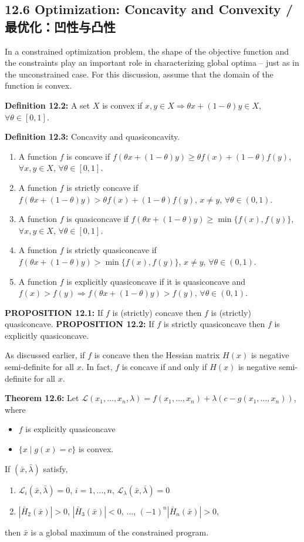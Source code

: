 \subsection{12.6 Optimization: Concavity and Convexity / 最优化：凹性与凸性}

\begin{original}
In a constrained optimization problem, the shape of the objective function and the constraints play an important role in characterizing global optima -- just as in the unconstrained case. For this discussion, assume that the domain of the function is convex.

\textbf{Definition 12.2:} A set $X$ is convex if $x, y \in X \Rightarrow \theta x + (1-\theta)y \in X$, $\forall \theta \in [0,1]$.

\textbf{Definition 12.3:} Concavity and quasiconcavity.
\begin{enumerate}
\item A function $f$ is concave if $f(\theta x + (1-\theta)y) \geq \theta f(x) + (1-\theta)f(y)$, $\forall x,y \in X$, $\forall \theta \in [0,1]$.
\item A function $f$ is strictly concave if $f(\theta x + (1-\theta)y) > \theta f(x) + (1-\theta)f(y)$, $x \neq y$, $\forall \theta \in (0,1)$.
\item A function $f$ is quasiconcave if $f(\theta x + (1-\theta)y) \geq \min\{f(x), f(y)\}$, $\forall x,y \in X$, $\forall \theta \in [0,1]$.
\item A function $f$ is strictly quasiconcave if $f(\theta x + (1-\theta)y) > \min\{f(x), f(y)\}$, $x \neq y$, $\forall \theta \in (0,1)$.
\item A function $f$ is explicitly quasiconcave if it is quasiconcave and $f(x) > f(y) \Rightarrow f(\theta x + (1-\theta)y) > f(y)$, $\forall \theta \in (0,1)$.
\end{enumerate}

\textbf{PROPOSITION 12.1:} If $f$ is (strictly) concave then $f$ is (strictly) quasiconcave.
\textbf{PROPOSITION 12.2:} If $f$ is strictly quasiconcave then $f$ is explicitly quasiconcave.

As discussed earlier, if $f$ is concave then the Hessian matrix $H(x)$ is negative semi-definite for all $x$. In fact, $f$ is concave if and only if $H(x)$ is negative semi-definite for all $x$.

\textbf{Theorem 12.6:} Let $\mathcal{L}(x_1,\ldots,x_n,\lambda) = f(x_1,\ldots,x_n) + \lambda(c - g(x_1,\ldots,x_n))$, where
\begin{itemize}
\item[(a)] $f$ is explicitly quasiconcave
\item[(b)] $\{x \mid g(x) = c\}$ is convex.
\end{itemize}
If $(\bar{x}, \bar{\lambda})$ satisfy,
\begin{enumerate}
\item $\mathcal{L}_i(\bar{x}, \bar{\lambda}) = 0$, $i = 1,\ldots,n$, $\mathcal{L}_\lambda(\bar{x}, \bar{\lambda}) = 0$
\item $|\bar{H}_2(\bar{x})| > 0$, $|\bar{H}_3(\bar{x})| < 0$, $\ldots$, $(-1)^n|\bar{H}_n(\bar{x})| > 0$,
\end{enumerate}
then $\bar{x}$ is a global maximum of the constrained program.
\end{original}
